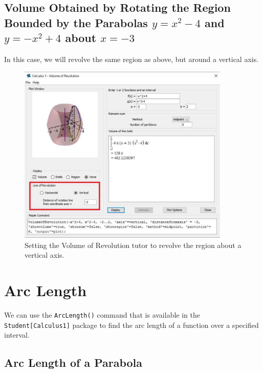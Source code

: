 \clearpage

\subsection{Volume Obtained by Rotating the Region Bounded by the Parabolas $y=x^2-4$ and $y=-x^2+4$ about $x=-3$}

In this case, we will revolve the same region as above, but around a vertical axis.


\begin{figure}
\caption{Setting the Volume of Revolution tutor to revolve the region about a vertical axis.}
\centering
\includegraphics[width=0.9\textwidth]{tutorials/figures/VoRTutorQ1-2-eps-converted-to.pdf}
\end{figure}

\section{Arc Length}
\label{sec:arc_length}
We can use the \texttt{ArcLength()} command that is available in the \texttt{Student[Calculus1]} package to find the arc length of a function over a specified interval.


\subsection{Arc Length of a Parabola}

